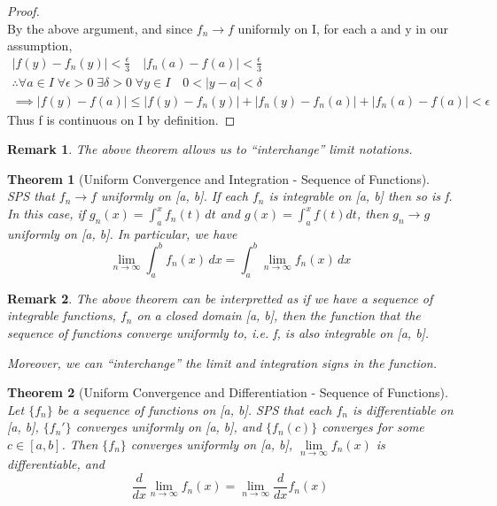 \documentclass[11pt, oneside]{book}
\theoremstyle{break}
\newtheorem{thm}{Theorem}[section]
\newtheorem*{proof}{Proof}
\newtheorem*{remark}{Remark}
\begin{document}
\begin{proof}
\begin{equation*}
	\end{equation*}
	By the above argument, and since $f_n \to f$ uniformly on I, for each a and y in our assumption,
	\begin{gather*}
		|f(y) - f_n(y)| < \frac{\epsilon}{3} \quad |f_n(a) - f(a)| < \frac{\epsilon}{3} \\
		\therefore \forall a \in I \; \forall \epsilon > 0 \; \exists \delta > 0 \; \forall y \in I \quad 0 < |y - a| < \delta \\
		\implies |f(y) - f(a)| \leq |f(y) - f_n(y)| + |f_n(y) - f_n(a)| + |f_n(a) - f(a)| < \epsilon
	\end{gather*}
	Thus f is continuous on I by definition.
\end{proof}

\begin{remark}
	The above theorem allows us to ``interchange'' limit notations.
\end{remark}

\begin{thm}[Uniform Convergence and Integration - Sequence of Functions]
	SPS that $f_n \to f$ uniformly on [a, b]. If each $f_n$ is integrable on [a, b] then so is f. In this case, if $g_n(x) = \int_{a}^{x} f_n(t) \,dt$ and $g(x) = \int_{a}^{x} f(t) dt$, then $g_n \to g$ uniformly on [a, b]. In particular, we have
	\[
		\lim_{n \to \infty} \int_{a}^{b} f_n(x) \, dx = \int_{a}^{b} \lim_{n \to \infty} f_n(x) \, dx
	\]
\end{thm}

\begin{remark}
	The above theorem can be interpretted as if we have a sequence of integrable functions, $f_n$ on a closed domain [a, b], then the function that the sequence of functions converge uniformly to, i.e. f, is also integrable on [a, b].

	Moreover, we can ``interchange'' the limit and integration signs in the function.
\end{remark}

\begin{thm}[Uniform Convergence and Differentiation - Sequence of Functions]
	Let $\{f_n\}$ be a sequence of functions on [a, b]. SPS that each $f_n$ is differentiable on [a, b], $\{f_n'\}$ converges uniformly on [a, b], and $\{f_n(c)\}$ converges for some $c \in [a, b]$. Then $\{f_n\}$ converges uniformly on [a, b], $\lim\limits_{n \to \infty} f_n(x)$ is differentiable, and
	\[
		\frac{d}{dx} \lim_{n \to \infty} f_n(x) = \lim_{n \to \infty} \frac{d}{dx} f_n(x)
	\]
\end{thm}
\end{document}
